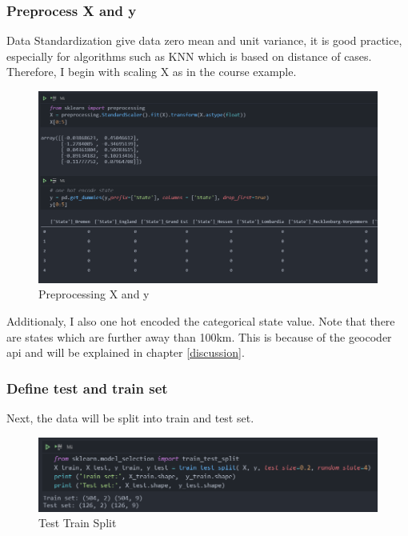 \subsubsection{Preprocess X and y}
Data Standardization give data zero mean and unit variance, it is good practice, especially for algorithms such as KNN which is based on distance of cases. Therefore, I begin with scaling X as in the course example.
\begin{figure}[H]
	\includegraphics[width=\textwidth]{Bilder/preprocess_columns.PNG}
	\caption{Preprocessing X and y}
\end{figure}
Additionaly, I also one hot encoded the categorical state value. Note that there are states which are further away than 100km. This is because of the geocoder api and will be explained in chapter \ref{discussion}.
\subsubsection{Define test and train set}
Next, the data will be split into train and test set.
\begin{figure}[H]
	\includegraphics[width=\textwidth]{Bilder/define_test_train.PNG}
	\caption{Test Train Split}
\end{figure}
